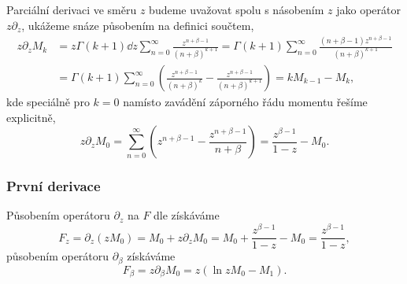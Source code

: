 Parciální derivaci ve směru $z$ budeme uvažovat spolu s násobením $z$ jako operátor $z\partial_z$, ukážeme snáze působením na definici součtem,
\begin{align}
    z\partial_zM_k&=z\Gamma(k+1)\dd{}{z}\sum_{n=0}^{\infty}\frac{z^{n+\beta-1}}{(n+\beta)^{k+1}}=\Gamma(k+1)\sum_{n=0}^{\infty}\frac{(n+\beta-1)z^{n+\beta-1}}{(n+\beta)^{k+1}}\nonumber\\
    &=\Gamma(k+1)\sum_{n=0}^{\infty}\left(\frac{z^{n+\beta-1}}{(n+\beta)^k}-\frac{z^{n+\beta-1}}{(n+\beta)^{k+1}}\right)=kM_{k-1}-M_k,
\end{align}
kde speciálně pro $k=0$ namísto zavádění záporného řádu momentu řešíme explicitně,
\begin{equation}
    z\partial_zM_0=\sum_{n=0}^{\infty}\left(z^{n+\beta-1}-\frac{z^{n+\beta-1}}{n+\beta}\right)=\frac{z^{\beta-1}}{1-z}-M_0.
\end{equation}

\subsubsection{První derivace}\label{sss:prvni_derivace}
Působením operátoru $\partial_z$ na $F$ dle  získáváme
\begin{equation}
    F_z=\partial_z (zM_0)=M_0+z\partial_z M_0 = M_0+\frac{z^{\beta-1}}{1-z}-M_0=\frac{z^{\beta-1}}{1-z},
\end{equation}
působením operátoru $\partial_\beta$ získáváme
\begin{equation}
    F_\beta=z \partial_\beta M_0=z(\ln{z}M_0-M_1).
\end{equation}

